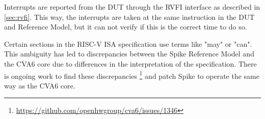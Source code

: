 Interrupts are reported from the DUT through the RVFI interface as described in \cref{sec:rvfi}. This way, the interrupts are taken at the same instruction in the DUT and Reference Model, but it can not verify if this is the correct time to do so.

Certain sections in the RISC-V ISA specification use terms like "may" or "can". This ambiguity has led to discrepancies between the Spike Reference Model and the CVA6 core due to differences in the interpretation of the specification. There is ongoing work to find these discrepancies \footnote{\url{https://github.com/openhwgroup/cva6/issues/1346}} and patch Spike to operate the same way as the CVA6 core. 

%
%
%
%
%    
